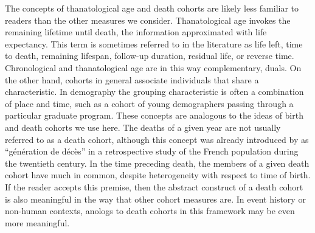 \documentclass[12pt,oneside,a4paper]{article} %
\begin{document}
The concepts of thanatological age and death cohorts are likely less familiar to
readers than the other measures we consider. Thanatological age invokes the
remaining lifetime until death, the information approximated with life
expectancy. This term is sometimes referred to in the literature as life left,
time to death, remaining lifespan, follow-up duration, residual life, or
reverse time.
Chronological and thanatological age are in this way complementary, duals. On the other hand, cohorts in general associate individuals that share a characteristic. In demography the grouping characteristic is often a combination of place and time, such as a cohort of young demographers passing through a particular graduate program. These concepts are analogous to the ideas of birth and death cohorts we use here. The deaths of a given year are not usually referred to as a death cohort, although this concept was already introduced by \cite{brouard1986} as ``g\'en\'eration de d\'ec\`es'' in a retrospective study of the French population during the twentieth century. In the time preceding death, the members of a given death cohort have much in common, despite heterogeneity with respect to time of birth. If the reader accepts this premise, then the abstract construct of a death cohort is also meaningful in the way that other cohort measures are. In event history or non-human contexts, anologs to death cohorts in this framework may be even more meaningful.
\end{document}
